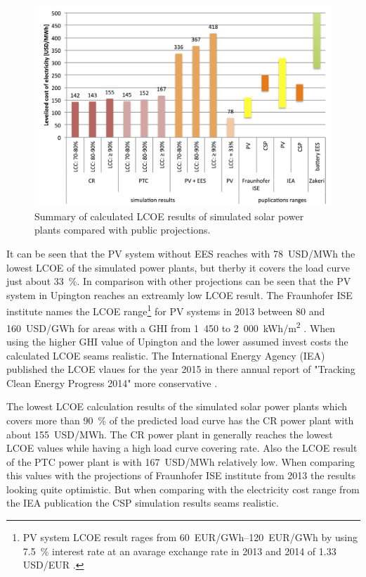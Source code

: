 \begin{figure}[htbp]  
\centering
\includegraphics[width=1\linewidth]{FIG/LCOEcomparision}
\caption[Summary of calculated LCOE results of simulated solar power plants compared with public projections.]{Summary of calculated LCOE results of simulated solar power plants compared with public projections.}\label{LCOEcomparision}
\end{figure}
It can be seen that the PV system without EES reaches with \SI{78}{USD/MWh} the lowest LCOE of the simulated power plants, but therby it covers the load curve just about \SI{33}{\percent}. In comparison with other projections can be seen that the PV system in Upington reaches an extreamly low LCOE result. The Fraunhofer ISE institute names the LCOE range\footnote{PV system LCOE result rages from \SIrange{60}{120}{EUR/GWh} by using \SI{7.5}{\percent} interest rate \cite{FraunhoferISE2013} at an avarage exchange rate in 2013 and 2014 of 1.33 USD/EUR \cite{StatistaGmbH2015}.} for PV systems in 2013 between 80 and \SI{160}{USD/GWh} for areas with a GHI from 1~450 to 2~000~kWh/m\textsuperscript{2} \cite{FraunhoferISE2013}. When using the higher GHI value of Upington and the lower assumed invest costs the calculated LCOE seams realistic. The International Energy Agency (IEA) published the LCOE vlaues for the year 2015 in there annual report of "Tracking Clean Energy Progress 2014" more conservative \cite{IEA2014c}.

The lowest LCOE calculation results of the simulated solar power plants which covers more than \SI{90}{\percent} of the predicted load curve has the CR power plant with about \SI{155}{USD/MWh}. The CR power plant in generally reaches the lowest LCOE values while having a high load curve covering rate. Also the LCOE result of the PTC power plant is with \SI{167}{USD/MWh} relatively low. When comparing this values with the projections of Fraunhofer ISE institute from 2013 the results looking quite optimistic. But when comparing with the electricity cost range from the IEA publication the CSP simulation results seams realistic.

